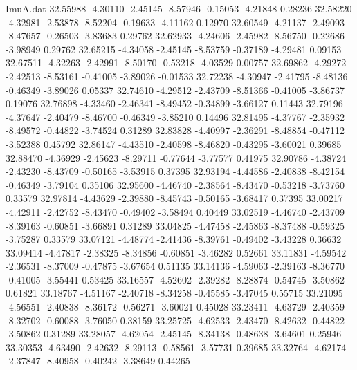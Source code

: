 \begin{filecontents}{ImuA.dat}
  32.55988   -4.30110   -2.45145   -8.57946   -0.15053   -4.21848    0.28236
  32.58220   -4.32981   -2.53878   -8.52204   -0.19633   -4.11162    0.12970
  32.60549   -4.21137   -2.49093   -8.47657   -0.26503   -3.83683    0.29762
  32.62933   -4.24606   -2.45982   -8.56750   -0.22686   -3.98949    0.29762
  32.65215   -4.34058   -2.45145   -8.53759   -0.37189   -4.29481    0.09153
  32.67511   -4.32263   -2.42991   -8.50170   -0.53218   -4.03529    0.00757
  32.69862   -4.29272   -2.42513   -8.53161   -0.41005   -3.89026   -0.01533
  32.72238   -4.30947   -2.41795   -8.48136   -0.46349   -3.89026    0.05337
  32.74610   -4.29512   -2.43709   -8.51366   -0.41005   -3.86737    0.19076
  32.76898   -4.33460   -2.46341   -8.49452   -0.34899   -3.66127    0.11443
  32.79196   -4.37647   -2.40479   -8.46700   -0.46349   -3.85210    0.14496
  32.81495   -4.37767   -2.35932   -8.49572   -0.44822   -3.74524    0.31289
  32.83828   -4.40997   -2.36291   -8.48854   -0.47112   -3.52388    0.45792
  32.86147   -4.43510   -2.40598   -8.46820   -0.43295   -3.60021    0.39685
  32.88470   -4.36929   -2.45623   -8.29711   -0.77644   -3.77577    0.41975
  32.90786   -4.38724   -2.43230   -8.43709   -0.50165   -3.53915    0.37395
  32.93194   -4.44586   -2.40838   -8.42154   -0.46349   -3.79104    0.35106
  32.95600   -4.46740   -2.38564   -8.43470   -0.53218   -3.73760    0.33579
  32.97814   -4.43629   -2.39880   -8.45743   -0.50165   -3.68417    0.37395
  33.00217   -4.42911   -2.42752   -8.43470   -0.49402   -3.58494    0.40449
  33.02519   -4.46740   -2.43709   -8.39163   -0.60851   -3.66891    0.31289
  33.04825   -4.47458   -2.45863   -8.37488   -0.59325   -3.75287    0.33579
  33.07121   -4.48774   -2.41436   -8.39761   -0.49402   -3.43228    0.36632
  33.09414   -4.47817   -2.38325   -8.34856   -0.60851   -3.46282    0.52661
  33.11831   -4.59542   -2.36531   -8.37009   -0.47875   -3.67654    0.51135
  33.14136   -4.59063   -2.39163   -8.36770   -0.41005   -3.55441    0.53425
  33.16557   -4.52602   -2.39282   -8.28874   -0.54745   -3.50862    0.61821
  33.18767   -4.51167   -2.40718   -8.34258   -0.45585   -3.47045    0.55715
  33.21095   -4.56551   -2.40838   -8.36172   -0.56271   -3.60021    0.45028
  33.23411   -4.63729   -2.40359   -8.32702   -0.60088   -3.76050    0.38159
  33.25725   -4.62533   -2.43470   -8.42632   -0.44822   -3.50862    0.31289
  33.28057   -4.62054   -2.45145   -8.34138   -0.48638   -3.64601    0.25946
  33.30353   -4.63490   -2.42632   -8.29113   -0.58561   -3.57731    0.39685
  33.32764   -4.62174   -2.37847   -8.40958   -0.40242   -3.38649    0.44265

\end{filecontents}
